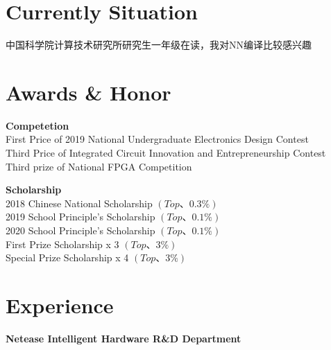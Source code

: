 \documentclass[a4paper,10pt]{article}
\begin{document}
\begin{adjustbox}{valign=t}
\begin{minipage}{0.6\textwidth} %
\section*{Currently Situation}
\begin{description}
	\raggedright
	\item 中国科学院计算技术研究所研究生一年级在读，我对NN编译比较感兴趣
\end{description}

\section*{Awards \& Honor}
\begin{description}
\raggedright
\item [] \textbf{Competetion} \\
	First Price of 2019 National Undergraduate Electronics Design Contest \\
	Third Price of Integrated Circuit Innovation and Entrepreneurship Contest \\
	Third prize of National FPGA Competition \\

	\item [] \textbf{Scholarship} \\
	2018 Chinese National Scholarship $\left( Top 、 0.3 \% \right)$ \\
	2019 School Principle's Scholarship $\left( Top 、 0.1 \% \right)$ \\
	2020 School Principle's Scholarship $\left( Top 、 0.1 \% \right)$ \\
	First Prize Scholarship x 3 $\left( Top 、 3 \% \right)$ \\
	Special Prize Scholarship x 4 $\left( Top 、 3 \% \right)$ 


\end{description}

\section*{Experience}
\begin{description}
\raggedright
\item[\normalfont \textcolor{ColorOne}{Sep. 2021 - Oct. 2021.}] 
	\textbf{Netease Intelligent Hardware R\&D Department}\\ \medskip
	

\end{description}
\end{minipage}
\end{adjustbox}
\end{document}
